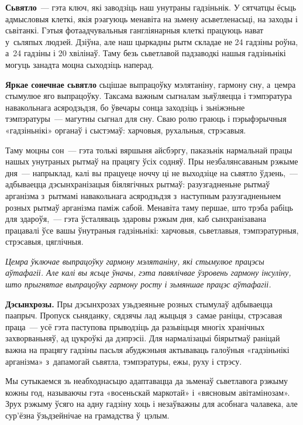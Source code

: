 \textbf{Сьвятло}~--- гэта ключ, які заводзіць наш унутраны гадзіньнік. У сятчатцы ёсьць адмысловыя клеткі, якія рэагуюць менавіта на зьмену асьветленасьці, на заходы і сьвітанкі. Гэтыя фотаадчувальныя гангліянарныя клеткі працуюць нават у~сьляпых людзей. Дзіўна, але наш цыркадны рытм складае не 24 гадзіны роўна, а~24 гадзіны і 20 хвілінаў. Таму безь сьветлавой падзаводкі нашыя гадзіньнікі могуць занадта моцна сыходзіць наперад.

\textbf{Яркае сонечнае сьвятло} сьцішае выпрацоўку мэлятаніну, гармону сну, а~цемра стымулюе яго выпрацоўку. Таксама важным сыгналам зьяўляецца і тэмпэратура навакольнага асяродзьдзя, бо ўвечары сонца заходзіць і зьніжэньне тэмпэратуры~--- магутны сыгнал для сну. Сваю ролю граюць і пэрыфэрычныя «гадзіньнікі» органаў і сыстэмаў: харчовыя, рухальныя, стрэсавыя.

Таму моцны сон~--- гэта толькі вяршыня айсбэргу, паказьнік нармальнай працы нашых унутраных рытмаў на працягу ўсіх содняў. Пры незбалянсаваным рэжыме дня~--- напрыклад, калі вы працуеце ноччу ці не выходзіце на сьвятло ўдзень,~--- адбываецца дэсынхранізацыя біялягічных рытмаў: разузгадненьне рытмаў арганізма з~рытмамі навакольнага асяродзьдзя з~наступным разузгадненьнем розных рытмаў арганізма паміж сабой. Менавіта таму першае, што трэба рабіць для здароўя,~--- гэта ўсталяваць здаровы рэжым дня, каб сынхранізавана працавалі ўсе вашы ўнутраныя гадзіньнікі: харчовыя, сьветлавыя, тэмпэратурныя, стрэсавыя, цяглічныя.

\emph{Цемра ўключае выпрацоўку гармону мэлятаніну, які стымулюе працэсы аўтафагіі. Але калі вы ясьце ўначы, гэта павялічвае ўзровень гармону інсуліну, што прыгнятае выпрацоўку гармону росту і зьмяншае працэс аўтафагіі.}

\textbf{Дэсынхрозы.} Пры дэсынхрозах узьдзеяньне розных стымулаў адбываецца паапрыч. Пропуск сьняданку, сядзячы лад жыцьця з~самае раніцы, стрэсавая праца~--- усё гэта паступова прыводзіць да разьвіцьця многіх хранічных захворваньняў, ад цукроўкі да дэпрэсіі. Для нармалізацыі біярытмаў раніцай важна на працягу гадзіны пасьля абуджэньня актываваць галоўныя «гадзіньнікі арганізма» з~дапамогай сьвятла, тэмпэратуры, ежы, руху і стрэсу. 


Мы сутыкаемся зь неабходнасьцю адаптавацца да зьменаў сьветлавога рэжыму кожны год, называючы гэта «восеньскай маркотай» і «вясновым авітамінозам». Зрух рэжыму ўсяго на адну гадзіну хоць і незаўважны для асобнага чалавека, але сур'ёзна ўзьдзейнічае на грамадства ў~цэлым.

